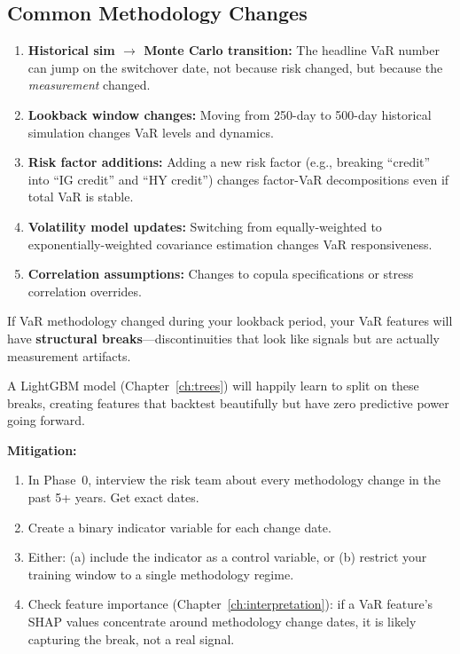 \subsection{Common Methodology Changes}

\begin{enumerate}[nosep]
  \item \textbf{Historical sim $\to$ Monte Carlo transition:} The
        headline VaR number can jump on the switchover date, not because
        risk changed, but because the \emph{measurement} changed.
  \item \textbf{Lookback window changes:} Moving from 250-day to
        500-day historical simulation changes VaR levels and dynamics.
  \item \textbf{Risk factor additions:} Adding a new risk factor
        (e.g., breaking ``credit'' into ``IG credit'' and ``HY credit'')
        changes factor-VaR decompositions even if total VaR is stable.
  \item \textbf{Volatility model updates:} Switching from equally-weighted
        to exponentially-weighted covariance estimation changes VaR
        responsiveness.
  \item \textbf{Correlation assumptions:} Changes to copula
        specifications or stress correlation overrides.
\end{enumerate}

\begin{warning}
If VaR methodology changed during your lookback period, your VaR features
will have \textbf{structural breaks}---discontinuities that look like
signals but are actually measurement artifacts.

A LightGBM model (Chapter~\ref{ch:trees}) will happily learn to
split on these breaks, creating features that backtest beautifully but
have zero predictive power going forward.

\textbf{Mitigation:}
\begin{enumerate}[nosep]
  \item In Phase~0, interview the risk team about every methodology
        change in the past 5+ years.  Get exact dates.
  \item Create a binary indicator variable for each change date.
  \item Either: (a) include the indicator as a control variable, or
        (b) restrict your training window to a single methodology regime.
  \item Check feature importance (Chapter~\ref{ch:interpretation}):
        if a VaR feature's SHAP values concentrate around methodology
        change dates, it is likely capturing the break, not a real signal.
\end{enumerate}
\end{warning}

